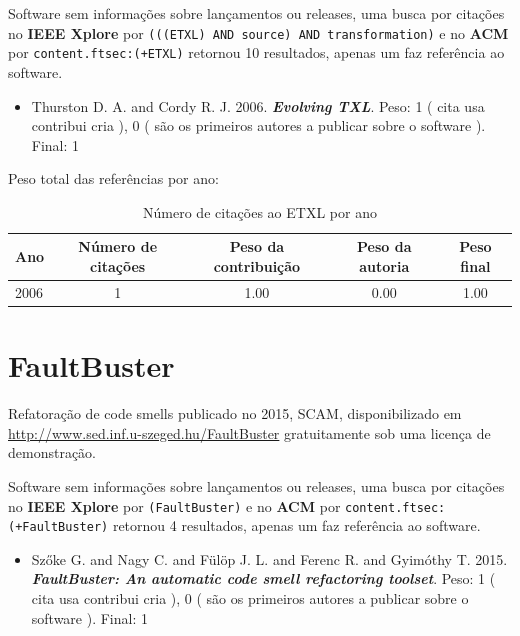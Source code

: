 Software sem informações sobre lançamentos ou releases,
uma busca por citações no {\bf IEEE Xplore} por
\texttt{(((ETXL) AND source) AND transformation)}
e no {\bf ACM} por
\texttt{content.ftsec:(+ETXL)}
retornou
10 resultados,
apenas um faz referência ao software.

\begin{itemize}
\item Thurston D. A. and Cordy R. J.
      2006.
        \textbf{\textit{ Evolving TXL}}.
      Peso:
      1 (
          cita
          usa
          contribui
          cria
      ),
      0 (
são os primeiros autores a publicar sobre o software
      ).
      Final:
      1

\end{itemize}

Peso total das referências por ano:

\begin{table}[h]
\caption{Número de citações ao ETXL por ano}
\centering
\begin{tabular}{| l | c | c | c | c |}
  \hline
  Ano & Número de citações & Peso da contribuição & Peso da autoria & Peso final \\
  \hline
  2006
    & 1
    & 1.00
    & 0.00
    & 1.00 \\
  \hline
\end{tabular}
\end{table}


\section{FaultBuster}

Refatoração de code smells
publicado no 2015, SCAM,
disponibilizado em \url{http://www.sed.inf.u-szeged.hu/FaultBuster}
gratuitamente
sob uma licença de demonstração.

Software sem informações sobre lançamentos ou releases,
uma busca por citações no {\bf IEEE Xplore} por
\texttt{(FaultBuster)}
e no {\bf ACM} por
\texttt{content.ftsec:(+FaultBuster)}
retornou
4 resultados,
apenas um faz referência ao software.

\begin{itemize}
\item Szőke G. and Nagy C. and Fülöp J. L. and Ferenc R. and Gyimóthy T.
      2015.
        \textbf{\textit{ FaultBuster: An automatic code smell refactoring toolset}}.
      Peso:
      1 (
          cita
          usa
          contribui
          cria
      ),
      0 (
são os primeiros autores a publicar sobre o software
      ).
      Final:
      1

\end{itemize}

